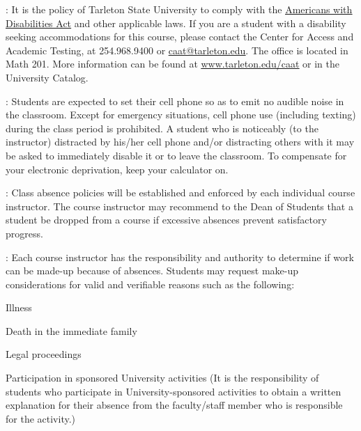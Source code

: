 \documentclass[letterpaper]{article}
\begin{document}
: It is the policy of Tarleton State University to comply with the \href{http://www.ada.gov}{\underline{Americans with Disabilities Act}} and other applicable laws. If you are a student with a disability seeking accommodations for this course, please contact the Center for Access and Academic Testing, at 254.968.9400 or \href{mailto:caat@tarleton.edu}{\underline{caat@tarleton.edu}}. The office is located in Math 201. More information can be found at \href{http://www.tarleton.edu/caat}{\underline{www.tarleton.edu/caat}} or in the University Catalog.


: Students are expected to set their cell phone so as to emit no audible noise in the classroom. Except for emergency situations, cell phone use (including texting) during the class period is prohibited. A student who is noticeably (to the instructor) distracted by his/her cell phone and/or distracting others with it may be asked to immediately disable it or to leave the classroom.  To compensate for your electronic deprivation, keep your calculator on.

:  Class absence policies will be established and enforced by each individual course instructor.  The course instructor may recommend to the Dean of Students that a student be dropped from a course if excessive absences prevent satisfactory progress.

:  Each course instructor has the responsibility and authority to determine if work can be made-up because of absences.  Students may request make-up considerations for valid and verifiable reasons such as the following:
\bit
\item Illness
\item Death in the immediate family
\item Legal proceedings
\item Participation in sponsored University activities (It is the responsibility of students who participate in University-sponsored activities to obtain a written explanation for their absence from the faculty/staff member who is responsible for the activity.)
\eit

\end{document}
